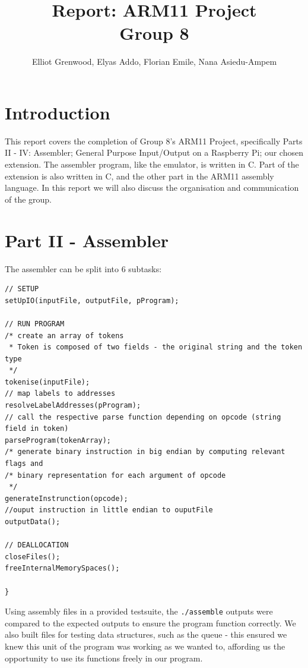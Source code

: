 \documentclass[11pt]{article}
\begin{document}
\title{Report: ARM11 Project \\ Group 8}
\author{Elliot Grenwood, Elyas Addo, Florian Emile, Nana Asiedu-Ampem}

\maketitle

\section{Introduction}
This report covers the completion of Group 8's ARM11 Project, specifically Parts II - IV: Assembler; General Purpose Input/Output on a Raspberry Pi; our chosen extension. The assembler program, like the emulator, is written in C. Part of the extension is also written in C, and the other part in the ARM11 assembly language. In this report we will also discuss the organisation and communication of the group.

\section{Part II - Assembler}
The assembler can be split into 6 subtasks:\newline

\begin{lstlisting}
// SETUP
setUpIO(inputFile, outputFile, pProgram);

// RUN PROGRAM
/* create an array of tokens 
 * Token is composed of two fields - the original string and the token type
 */ 
tokenise(inputFile);
// map labels to addresses
resolveLabelAddresses(pProgram);
// call the respective parse function depending on opcode (string field in token)  
parseProgram(tokenArray);
/* generate binary instruction in big endian by computing relevant flags and 
/* binary representation for each argument of opcode 
 */
generateInstrunction(opcode);
//ouput instruction in little endian to ouputFile 
outputData();

// DEALLOCATION
closeFiles();
freeInternalMemorySpaces();

}
\end{lstlisting}

Using assembly files in a provided testsuite, the \texttt{./assemble} outputs were compared to the expected outputs to ensure the program function correctly. We also built files for testing data structures, such as the queue - this ensured we knew this unit of the program was working as we wanted to, affording us the opportunity to use its functions freely in our program.
\end{document}
